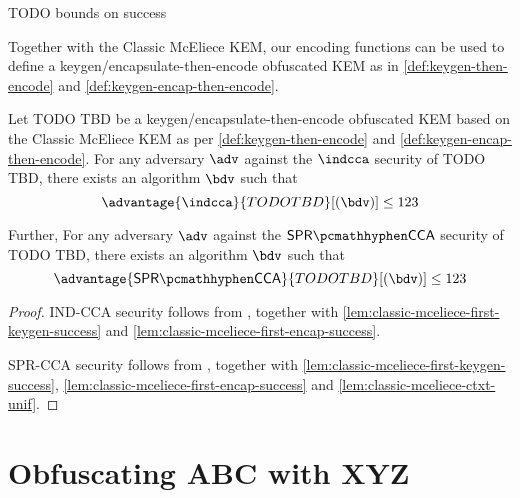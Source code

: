 \begin{lemma}[[First-encap success probability of TODO TBD] \label{lem:classic-mceliece-first-encap-success}
    TODO bounds on success
\end{lemma}

Together with the Classic McEliece KEM, our encoding functions can be used to define a keygen/encapsulate-then-encode obfuscated KEM as in \cref{def:keygen-then-encode} and \ref{def:keygen-encap-then-encode}.

\begin{theorem}
    Let TODO TBD be a keygen/encapsulate-then-encode obfuscated KEM based on the Classic McEliece KEM as per \cref{def:keygen-then-encode} and \ref{def:keygen-encap-then-encode}. For any adversary $\adv$ against the $\indcca$ security of TODO TBD, there exists an algorithm $\bdv$ such that
    \[ \advantage{\indcca}{TODO TBD}[(\bdv)] \leq 123 \]

    Further,  For any adversary $\adv$ against the $\sprcca$ security of TODO TBD, there exists an algorithm $\bdv$ such that
    \[ \advantage{\sprcca}{TODO TBD}[(\bdv)] \leq 123 \]
\end{theorem}
\begin{proof}
    IND-CCA security follows from \cite[Theorem~2.12]{CCS:GunSteVei24}, together with \cref{lem:classic-mceliece-first-keygen-success} and \ref{lem:classic-mceliece-first-encap-success}.
    
    SPR-CCA security follows from \cite[Theorem~2.13]{CCS:GunSteVei24}, together with \cref{lem:classic-mceliece-first-keygen-success}, \ref{lem:classic-mceliece-first-encap-success} and \ref{lem:classic-mceliece-ctxt-unif}.
\end{proof}

\section{Obfuscating ABC with XYZ} \label{sec:tbd}

